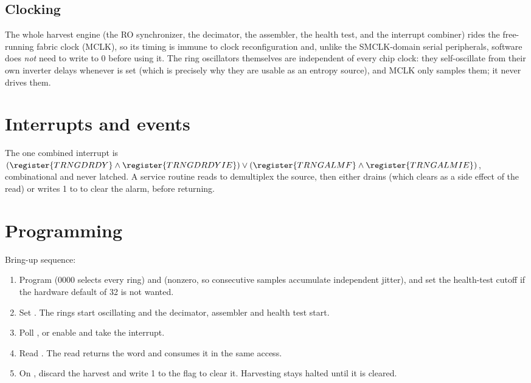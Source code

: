 \subsection{Clocking}

The whole harvest engine (the RO synchronizer, the decimator, the assembler, the health test, and the interrupt combiner) rides the free-running fabric clock (MCLK), so its timing is immune to clock reconfiguration and, unlike the SMCLK-domain serial peripherals, software does \emph{not} need to write  to 0 before using it. The ring oscillators themselves are independent of every chip clock: they self-oscillate from their own inverter delays whenever  is set (which is precisely why they are usable as an entropy source), and MCLK only samples them; it never drives them.

\section{Interrupts and events}

The one combined interrupt is $(\register{TRNGDRDY} \wedge \register{TRNGDRDYIE}) \vee (\register{TRNGALMF} \wedge \register{TRNGALMIE})$, combinational and never latched. A service routine reads  to demultiplex the source, then either drains  (which clears  as a side effect of the read) or writes 1 to  to clear the alarm, before returning.

\section{Programming}

Bring-up sequence:

\begin{enumerate}
	\item Program  (0000 selects every ring) and  (nonzero, so consecutive samples accumulate independent jitter), and set the health-test cutoff  if the hardware default of 32 is not wanted.
	\item Set . The rings start oscillating and the decimator, assembler and health test start.
	\item Poll , or enable  and take the interrupt.
	\item Read . The read returns the word and consumes it in the same access.
	\item On , discard the harvest and write 1 to the flag to clear it. Harvesting stays halted until it is cleared.
\end{enumerate}

